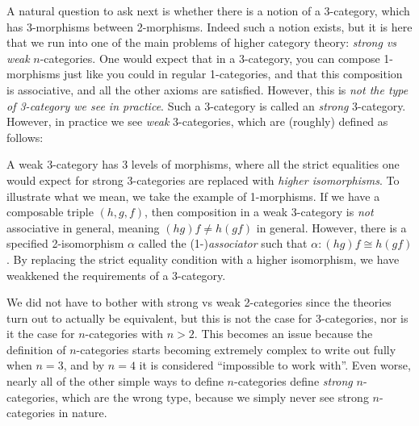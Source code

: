 A natural question to ask next is whether there is a notion of a 3-category, which has 3-morphisms between 2-morphisms. Indeed such a notion exists, but it is here that we run into one of the main problems of higher category theory: \emph{strong vs weak} $n$-categories. One would expect that in a 3-category, you can compose 1-morphisms just like you could in regular 1-categories, and that this composition is associative, and all the other axioms are satisfied. However, this is \emph{not the type of 3-category we see in practice}. Such a 3-category is called an \emph{strong} 3-category. However, in practice we see \emph{weak} 3-categories, which are (roughly) defined as follows:

A weak 3-category has 3 levels of morphisms, where all the strict equalities one would expect for strong 3-categories are replaced with \emph{higher isomorphisms}. To illustrate what we mean, we take the example of 1-morphisms. If we have a composable triple $(h,g,f)$, then composition in a weak 3-category is \emph{not} associative in general, meaning $(hg)f\neq h(gf)$ in general. However, there is a specified 2-isomorphism $\alpha $ called the (1-)\emph{associator} such that $\alpha : (hg)f \cong h(gf)$. By replacing the strict equality condition with a higher isomorphism, we have weakkened the requirements of a 3-category.

We did not have to bother with strong vs weak 2-categories since the theories turn out to actually be equivalent, but this is not the case for 3-categories, nor is it the case for $n$-categories with $n>2$. This becomes an issue because the definition of $n$-categories starts becoming extremely complex to write out fully when $n=3$, and by $n=4$ it is considered ``impossible to work with''. Even worse, nearly all of the other simple ways to define $n$-categories define \emph{strong} $n$-categories, which are the wrong type, because we simply never see strong $n$-categories in nature.


